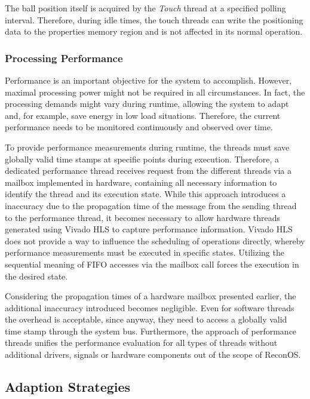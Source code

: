 The ball position itself is acquired by the \emph{Touch} thread at a specified
polling interval. Therefore, during idle times, the touch threads can write
the positioning data to the properties memory region and is not affected in
its normal operation.

\subsubsection{Processing Performance}
Performance is an important objective for the system to accomplish. However,
maximal processing power might not be required in all circumstances. In fact,
the processing demands might vary during runtime, allowing the system to adapt
and, for example, save energy in low load situations. Therefore, the current
performance needs to be monitored continuously and observed over time.

To provide performance measurements during runtime, the threads must save
globally valid time stamps at specific points during execution. Therefore, a
dedicated performance thread receives request from the different threads via a
mailbox implemented in hardware, containing all necessary information to
identify the thread and its execution state. While this approach introduces a
inaccuracy due to the propagation time of the message from the sending thread
to the performance thread, it becomes necessary to allow hardware threads
generated using Vivado HLS to capture performance information. Vivado HLS does
not provide a way to influence the scheduling of operations directly, whereby
performance measurements must be executed in specific states. Utilizing the
sequential meaning of \ac{FIFO} accesses via the mailbox call forces the execution in the desired state.

Considering the propagation times of a hardware mailbox presented earlier, the
additional inaccuracy introduced becomes negligible. Even for software threads
the overhead is acceptable, since anyway, they need to access a globally valid
time stamp through the system bus. Furthermore, the approach of performance
threads unifies the performance evaluation for all types of threads without
additional drivers, signals or hardware components out of the scope of
ReconOS.

\subsection{Adaption Strategies}

